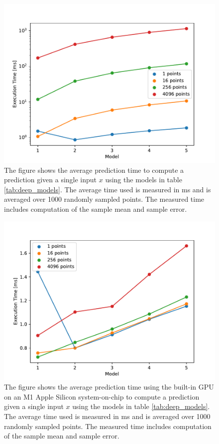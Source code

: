 \begin{figure}
    \centering
    \includegraphics[scale=0.8]{figures/prediction_time/prediction_time.pdf}
    \caption{The figure shows the average prediction time to compute a prediction given a single input $x$ using the models in table \ref{tab:deep_models}. The average time used is measured in ms and is averaged over 1000 randomly sampled points. The measured time includes computation of the sample mean and sample error.
    }
    \label{fig:prediction_time}
\end{figure}

\begin{figure}
    \centering
    \includegraphics[scale=0.8]{figures/prediction_time/prediction_time_gpu.pdf}
    \caption{The figure shows the average prediction time using the built-in GPU on an M1 Apple Silicon system-on-chip to compute a prediction given a single input $x$ using the models in table \ref{tab:deep_models}. The average time used is measured in ms and is averaged over 1000 randomly sampled points. The measured time includes computation of the sample mean and sample error. 
    }
    \label{fig:prediction_time_gpu}
\end{figure}

